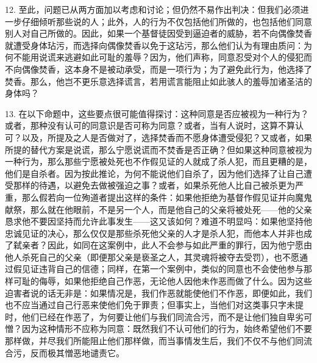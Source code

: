 12. 至此，问题已从两方面加以考虑和讨论；但仍然不易作出判决：但我们必须进一步仔细倾听那些说的人；此外，人的行为不仅包括他们所做的，也包括他们同意别人对自己所做的。因此，如果一个基督徒因受到逼迫者的威胁，若不向偶像焚香就遭受身体玷污，而选择向偶像焚香以免于这玷污，那么他们认为有理由质问：为何不能用说谎来逃避如此可耻的羞辱？因为，他们声称，同意忍受对个人的侵犯而不向偶像焚香，这本身不是被动承受，而是一项行为；为了避免此行为，他选择了焚香。那么，他岂不更乐意选择谎言，若用谎言能阻止如此骇人的羞辱加诸圣洁的身体吗？\par

13. 在以下命题中，这些要点很可能值得探讨：这种同意是否应被视为一种行为？或者，那种没有认可的同意识是否可称为同意？或者，当有人说时，这算不算认可？以及，所提及之人是否做对了，选择焚香而不愿身体遭受侵犯？又或者，如果所提的替代方案是说谎，那么宁愿说谎而不焚香是否正确？但如果这种同意被视为一种行为，那么那些宁愿被处死也不作假见证的人就成了杀人犯，而且更糟的是，他们是自杀者。因为按此推论，为何不能说他们自杀了，因为他们选择了让自己遭受那样的待遇，以避免去做被强迫之事？或者，如果杀死他人比自己被杀更为严重，那么假若向一位殉道者提出这样的条件：如果他拒绝为基督作假见证并向魔鬼献祭，那么就在他眼前，不是另一个人，而是他自己的父亲将被处死——他的父亲恳求他不要因坚持而允许此事发生——这又该如何？难道不明显吗：如果他坚持他忠诚见证的决心，那么仅仅是那些杀死他父亲的人才是杀人犯，而他本人并非也成了弑亲者？因此，如同在这案例中，此人不会参与如此严重的罪行，因为他宁愿由他人杀死自己的父亲（即便那父亲是亵圣之人，其灵魂将被夺去受罚），也不愿通过假见证违背自己的信德；同样，在第一个案例中，类似的同意也不会使他参与那样可耻的侮辱，如果他拒绝自己作恶，无论他人因他未作恶而做了什么。因为这些迫害者说的话无非是：如果情况是，我们作恶就能使他们不作恶，即便如此，我们也不应当通过自己行恶来使他们免于罪责；但事实上，当他们对这类事只字未提时，他们已经在作恶了，为何要让他们与我们同流合污，而不是让他们独自卑劣可憎？因为这种情形不应称为同意：既然我们不认可他们的行为，始终希望他们不要那样做，并尽我们所能阻止他们那样做，而当事情发生后，我们不仅不与他们同流合污，反而极其憎恶地谴责它。\par

